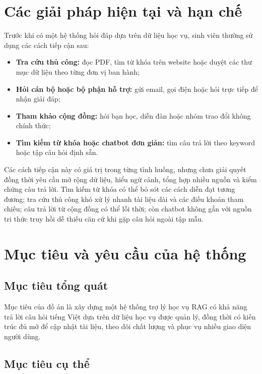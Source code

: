 \documentclass[../DoAn.tex]{subfiles}
\begin{document}
\section{Các giải pháp hiện tại và hạn chế}
\label{sec:giaiphap}

Trước khi có một hệ thống hỏi đáp dựa trên dữ liệu học vụ, sinh viên thường sử
dụng các cách tiếp cận sau:

\begin{itemize}
    \item \textbf{Tra cứu thủ công:} đọc PDF, tìm từ khóa trên website hoặc duyệt
    các thư mục dữ liệu theo từng đơn vị ban hành;
    \item \textbf{Hỏi cán bộ hoặc bộ phận hỗ trợ:} gửi email, gọi điện hoặc hỏi
    trực tiếp để nhận giải đáp;
    \item \textbf{Tham khảo cộng đồng:} hỏi bạn học, diễn đàn hoặc nhóm trao đổi
    không chính thức;
    \item \textbf{Tìm kiếm từ khóa hoặc chatbot đơn giản:} tìm câu trả lời theo
    keyword hoặc tập câu hỏi định sẵn.
\end{itemize}

Các cách tiếp cận này có giá trị trong từng tình huống, nhưng chưa giải quyết
đồng thời yêu cầu mở rộng dữ liệu, hiểu ngữ cảnh, tổng hợp nhiều nguồn và kiểm
chứng câu trả lời. Tìm kiếm từ khóa có thể bỏ sót các cách diễn đạt tương đương;
tra cứu thủ công khó xử lý nhanh tài liệu dài và các điều khoản tham chiếu; câu
trả lời từ cộng đồng có thể lỗi thời; còn chatbot không gắn với nguồn tri thức
truy hồi dễ thiếu căn cứ khi gặp câu hỏi ngoài tập mẫu.

\section{Mục tiêu và yêu cầu của hệ thống}
\label{sec:muctieu}

\subsection{Mục tiêu tổng quát}

Mục tiêu của đồ án là xây dựng một hệ thống trợ lý học vụ RAG có khả năng trả lời
câu hỏi tiếng Việt dựa trên dữ liệu học vụ được quản lý, đồng thời có kiến trúc
đủ mở để cập nhật tài liệu, theo dõi chất lượng và phục vụ nhiều giao diện người
dùng.

\subsection{Mục tiêu cụ thể}
\end{document}

